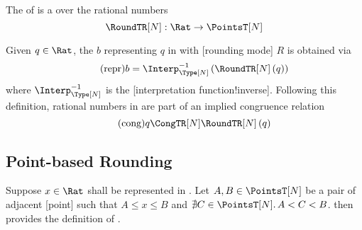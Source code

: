 \begin{definition}
    The  \RoundTR[N] of  \Type[N] is a  over the rational numbers
    \begin{equation*}
        \RoundTR[N] : \Rat \to \PointsT[N]
    \end{equation*}
\end{definition}

Given \(q \in \Rat\), the  \(b\) representing \(q\) in  \Type[N] with [rounding mode] \(R\) is obtained via
\begin{equation*}
    \label{eq:repr}
    \tag{repr}
    b = \Interp^{-1}_{\Type[N]}\left(\RoundTR[N]\left(q\right)\right)
\end{equation*}
where \(\Interp^{-1}_{\Type[N]}\) is the [interpretation function!inverse].
Following this definition, rational numbers in \Type[N] are part of an implied congruence relation \CongTR[N]{}
\begin{equation*}
    \label{eq:cong}
    \tag{cong}
    q \CongTR[N] \RoundTR[N]\left(q\right)
\end{equation*}

\subsection{Point-based Rounding}

Suppose \(x \in \Rat\) shall be represented in  \Type[N].
Let \(A, B \in \PointsT[N]\) be a pair of adjacent [point] such that \(A \le x \le B\) and \(\nexists C\in\PointsT[N]\ldotp A < C < B\).
 then provides the definition of \RoundTR[N].

